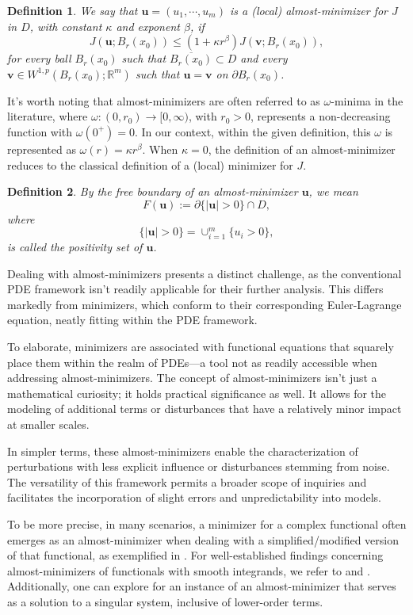\documentclass{amsart}
\newtheorem{definition}{Definition}[section]
\begin{document}
\begin{definition}
We say that $\mathbf{u}=(u_1,\cdots,u_m)$ is a (local) almost-minimizer for $J$ in $D$, with constant $\kappa$ and exponent $\beta$, if 
$$
J(\mathbf{u}; B_r(x_0)) \leq \left(1+\kappa r^{\beta} \right) J(\mathbf{v}; B_r(x_0)), 
$$
for every ball $B_r(x_0)$ such that $\overline{B_r(x_0)} \subset D$ and every $\mathbf{v} \in W^{1,p}(B_r(x_0); \mathbb{R}^m)$ such that $\mathbf{u}=\mathbf{v}$ on $\partial B_r(x_0)$.
\end{definition}


It's worth noting that almost-minimizers are often referred to as $\omega$-minima in the literature, where $\omega: (0, r_0) \to [0,\infty)$, with $r_0>0$, represents a non-decreasing function with $\omega (0^+)=0$. In our context, within the given definition, this $\omega$ is represented as $\omega(r) = \kappa r^{\beta}$. When $\kappa=0$, the definition of an almost-minimizer reduces to the classical definition of a (local) minimizer for $J$.

\begin{definition}
By the free boundary of an almost-minimizer $\mathbf{u}$, we mean 
$$ F(\mathbf{u}):=\partial \{|\mathbf{u}| > 0\} \cap D, $$
where
$$ \{|\mathbf{u}| > 0\}=\cup_{i=1}^{m} \{u_i>0\}, $$
is called the positivity set of $\mathbf{u}$.
\end{definition}


Dealing with almost-minimizers presents a distinct challenge, as the conventional PDE framework isn't readily applicable for their further analysis. This differs markedly from minimizers, which conform to their corresponding Euler-Lagrange equation, neatly fitting within the PDE framework.

To elaborate, minimizers are associated with functional equations that squarely place them within the realm of PDEs—a tool not as readily accessible when addressing almost-minimizers. The concept of almost-minimizers isn't just a mathematical curiosity; it holds practical significance as well. It allows for the modeling of additional terms or disturbances that have a relatively minor impact at smaller scales.

In simpler terms, these almost-minimizers enable the characterization of perturbations with less explicit influence or disturbances stemming from noise. The versatility of this framework permits a broader scope of inquiries and facilitates the incorporation of slight errors and unpredictability into models.

To be more precise, in many scenarios, a minimizer for a complex functional often emerges as an almost-minimizer when dealing with a simplified/modified version of that functional, as exemplified in \cite{dipierro2022lipschitz}. For well-established findings concerning almost-minimizers of functionals with smooth integrands, we  refer to \cite[Chapter 7]{giusti2003direct} and \cite[Section 4.5]{mingione2006regularity}. Additionally, one can explore \cite[Appendix A]{de2022almost} for an instance of an almost-minimizer that serves as a solution to a singular system, inclusive of lower-order terms.
\end{document}
